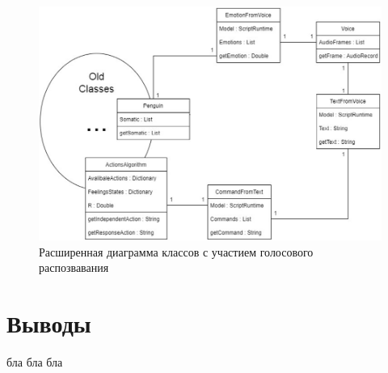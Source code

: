 \begin{figure}[!h]
\includegraphics[width=0.75\columnwidth]{./img/ncmodel0.jpg}
\centering
\caption{Расширенная диаграмма классов с участием голосового распозвавания}
\label{pic:ncmodel0}
\end{figure}

\section{Выводы}

бла бла бла
